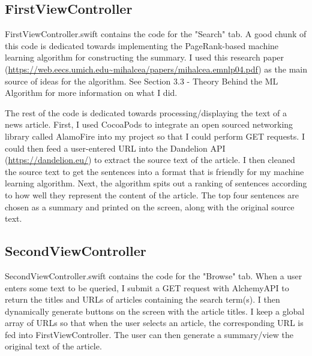 \documentclass[11pt, margin=1in]{article}
\begin{document}
\subsection{FirstViewController}
FirstViewController.swift contains the code for the "Search" tab.  A good chunk of this code is dedicated towards implementing the PageRank-based machine learning algorithm for constructing the summary.  I used this research paper (\url{https://web.eecs.umich.edu~mihalcea/papers/mihalcea.emnlp04.pdf}) as the main source of ideas for the algorithm.  See Section 3.3 - Theory Behind the ML Algorithm for more information on what I did.  

The rest of the code is dedicated towards processing/displaying the text of a news article.  First, I used CocoaPods to integrate an open sourced networking library called AlamoFire into my project so that I could perform GET requests.  I could then feed a user-entered URL into the Dandelion API (\url{https://dandelion.eu/}) to extract the source text of the article.  I then cleaned the source text to get the sentences into a format that is friendly for my machine learning algorithm.  Next, the algorithm spits out a ranking of sentences according to how well they represent the content of the article.  The top four sentences are chosen as a summary and printed on the screen, along with the original source text.               

\subsection{SecondViewController}
SecondViewController.swift contains the code for the "Browse" tab.  When a user enters some text to be queried, I submit a GET request with AlchemyAPI to return the titles and URLs of articles containing the search term(s).  I then dynamically generate buttons on the screen with the article titles.  I keep a global array of URLs so that when the user selects an article, the corresponding URL is fed into FirstViewController.  The user can then generate a summary/view the original text of  the article.  
\end{document}
